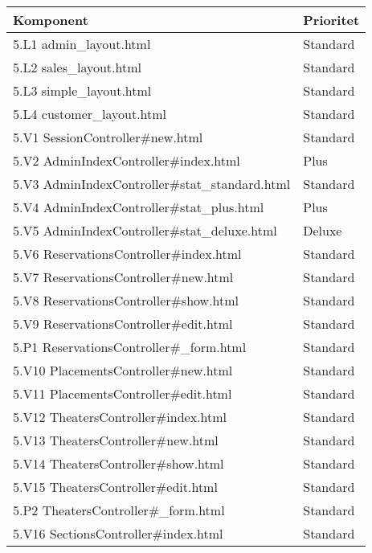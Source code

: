 \documentclass[a4paper, twoside, 11pt, titlepage]{article}
\begin{document}
		\begin {table} [ht] \begin{tabular} {  p{10cm} p{5.1cm} }
			\hline
			{\sffamily\textbf{Komponent}} & {\sffamily\textbf{Prioritet}} \\
			\hline
			{ 5.L1 admin\_layout.html } & { Standard } \\
			\hline
			{ 5.L2 sales\_layout.html } & { Standard } \\
			\hline
			{ 5.L3 simple\_layout.html } & { Standard } \\
			\hline
			{ 5.L4 customer\_layout.html } & { Standard } \\
			\hline
			{ 5.V1 SessionController\#new.html } & { Standard } \\
			\hline
			{ 5.V2 AdminIndexController\#index.html } & { Plus } \\
			\hline
			{ 5.V3 AdminIndexController\#stat\_standard.html } & { Standard } \\
			\hline
			{ 5.V4 AdminIndexController\#stat\_plus.html } & { Plus } \\
			\hline
			{ 5.V5 AdminIndexController\#stat\_deluxe.html } & { Deluxe } \\
			\hline
			{ 5.V6 ReservationsController\#index.html } & { Standard } \\
			\hline
			{ 5.V7 ReservationsController\#new.html } & { Standard } \\
			\hline
			{ 5.V8 ReservationsController\#show.html } & { Standard } \\
			\hline
			{ 5.V9 ReservationsController\#edit.html } & { Standard } \\
			\hline
			{ 5.P1 ReservationsController\#\_form.html } & { Standard } \\
			\hline
			{ 5.V10 PlacementsController\#new.html } & { Standard } \\
			\hline
			{ 5.V11 PlacementsController\#edit.html } & { Standard } \\
			\hline
			{ 5.V12 TheatersController\#index.html } & { Standard } \\
			\hline
			{ 5.V13 TheatersController\#new.html } & { Standard } \\
			\hline
			{ 5.V14 TheatersController\#show.html } & { Standard } \\
			\hline
			{ 5.V15 TheatersController\#edit.html } & { Standard } \\
			\hline
			{ 5.P2 TheatersController\#\_form.html } & { Standard } \\
			\hline
			{ 5.V16 SectionsController\#index.html } & { Standard } \\

\end{tabular}
\end{table}
\end{document}
